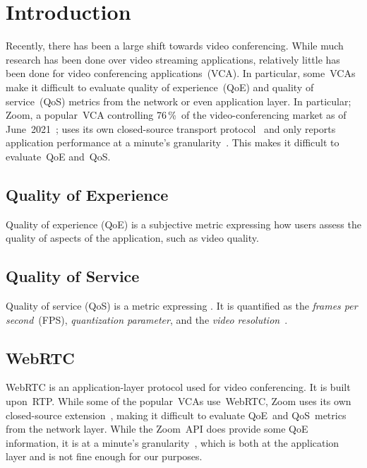 \section{Introduction}\label{introduction}
    Recently, there has been a large shift towards video conferencing. While much research has been done over video streaming applications, relatively little has been done for video conferencing applications~(VCA). In particular, some~VCAs make it difficult to evaluate quality of experience~(QoE) and quality of service~(QoS) metrics from the network or even application layer. In particular; Zoom, a popular~VCA controlling 76\,\%~of the video-conferencing market as of June~2021~\autocite{kim2021}; uses its own closed-source transport protocol~\autocite{marczak2020} and only reports application performance at a minute's granularity~\autocite{walia2019}. This makes it difficult to evaluate~QoE and~QoS.

    \subsection{Quality of Experience}\label{introduction:qoe}
        Quality of experience (QoE) is a subjective metric expressing how users assess the quality of aspects of the application, such as video quality. 


    \subsection{Quality of Service}\label{introduction:qos}
        Quality of service (QoS) is a metric expressing \todo. It is quantified as the \emph{frames per second}~(FPS), \emph{quantization parameter}, and the \emph{video resolution}~\autocite{MacMillanKyle2021MtPa}.

    \subsection{WebRTC}\label{introduction:webrtc}
        WebRTC is an application-layer protocol used for video conferencing. It is built upon~RTP. While some of the popular~VCAs use~WebRTC, Zoom uses its own closed-source extension~\autocite{marczak2020}, making it difficult to evaluate QoE~and QoS~metrics from the network layer. While the Zoom~API does provide some QoE information, it is at a minute's granularity~\autocite{walia2019}, which is both at the application layer and is not fine enough for our purposes.
